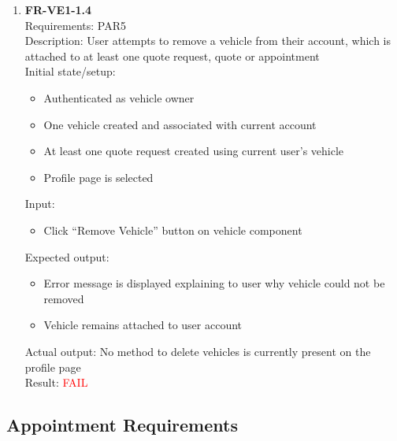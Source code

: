 \documentclass[12pt, titlepage]{article}
\newcommand{\testfail}{\textcolor{red}{FAIL}}
\begin{document}
\begin{enumerate}
                \item \textbf{FR-VE1-1.4} \label{FR-VE1-1.4} \\ Requirements: PAR5 \\
                    Description: User attempts to remove a vehicle from their account, which is attached to at least one quote request, quote or appointment \\
                    Initial state/setup: \begin{itemize}
                        \item Authenticated as vehicle owner
                        \item One vehicle created and associated with current account
                        \item At least one quote request created using current user's vehicle
                        \item Profile page is selected
                    \end{itemize}
                    Input: \begin{itemize}
                        \item Click ``Remove Vehicle'' button on vehicle component
                    \end{itemize}
                    Expected output: \begin{itemize}
                        \item Error message is displayed explaining to user why vehicle could not be removed
                        \item Vehicle remains attached to user account
                    \end{itemize}
                    Actual output: No method to delete vehicles is currently present on the profile page \\
                    Result: \testfail
            \end{enumerate}
            
            
        \subsection{Appointment Requirements}
\end{document}
